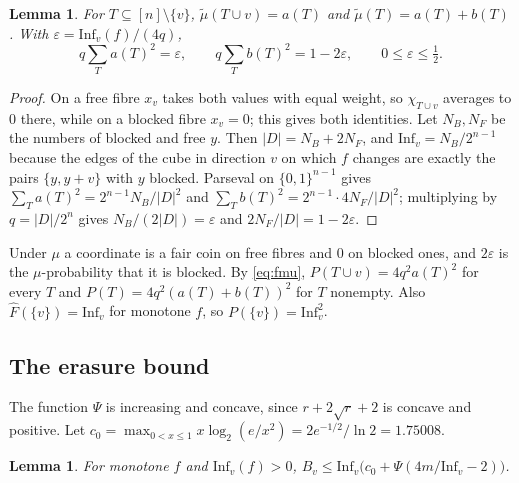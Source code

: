 \documentclass[11pt]{amsart}
\newtheorem{lemma}[theorem]{Lemma}
\theoremstyle{remark}
\newcommand{\Inf}{\mathrm{Inf}}
\newcommand{\bits}{\{0,1\}}
\newcommand{\eps}{\varepsilon}
\begin{document}
\begin{lemma}\label{lem:downset}
For $T\subseteq[n]\setminus\{v\}$, $\tilde\mu(T\cup v)=a(T)$ and $\tilde\mu(T)=a(T)+b(T)$. With
$\eps=\Inf_v(f)/(4q)$,
\[
q\sum_T a(T)^2=\eps,\qquad q\sum_T b(T)^2=1-2\eps,\qquad 0\le\eps\le\tfrac12 .
\]
\end{lemma}

\begin{proof}
On a free fibre $x_v$ takes both values with equal weight, so $\chi_{T\cup v}$ averages to $0$ there, while on a
blocked fibre $x_v=0$; this gives both identities. Let $N_B,N_F$ be the numbers of blocked and free $y$. Then
$|D|=N_B+2N_F$, and $\Inf_v=N_B/2^{n-1}$ because the edges of the cube in direction $v$ on which $f$ changes are
exactly the pairs $\{y,y+v\}$ with $y$ blocked. Parseval on $\bits^{n-1}$ gives
$\sum_Ta(T)^2=2^{n-1}N_B/|D|^2$ and $\sum_Tb(T)^2=2^{n-1}\cdot4N_F/|D|^2$; multiplying by $q=|D|/2^n$ gives
$N_B/(2|D|)=\eps$ and $2N_F/|D|=1-2\eps$.
\end{proof}

Under $\mu$ a coordinate is a fair coin on free fibres and $0$ on blocked ones, and $2\eps$ is the $\mu$-probability
that it is blocked. By \eqref{eq:fmu}, $P(T\cup v)=4q^2a(T)^2$ for every $T$ and $P(T)=4q^2(a(T)+b(T))^2$ for $T$
nonempty. Also $\widehat F(\{v\})=\Inf_v$ for monotone $f$, so $P(\{v\})=\Inf_v^2$.

\subsection{The erasure bound}
The function $\Psi$ is increasing and concave, since $r+2\sqrt r+2$ is concave and positive. Let
$c_0=\max_{0<x\le1}x\log_2(e/x^2)=2e^{-1/2}/\ln2=1.75008$.

\begin{lemma}\label{lem:erasure}
For monotone $f$ and $\Inf_v(f)>0$, $B_v\le\Inf_v\bigl(c_0+\Psi(4m/\Inf_v-2)\bigr)$.
\end{lemma}
\end{document}

